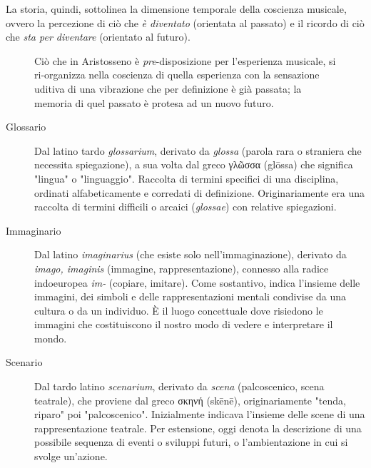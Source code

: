 \documentclass{gs}
\begin{document}
La storia, quindi, sottolinea la dimensione temporale della coscienza musicale, ovvero la percezione di ciò che \emph{è diventato} (orientata al passato) e il ricordo di ciò che \emph{sta per diventare} (orientato al futuro).

\begin{figure}[htbp]
\begin{center}
\caption{Ciò che in Aristosseno è \emph{pre}-disposizione per l'esperienza musicale, si ri-organizza nella coscienza  di quella esperienza con la sensazione uditiva di una vibrazione che per definizione è già passata; la memoria di quel passato è protesa ad un nuovo futuro.}
\label{coscienza}
\end{center}
\end{figure}

\begin{description}

  \item[Glossario] Dal latino tardo \emph{glossarium}, derivato da \emph{glossa} (parola rara o straniera che necessita spiegazione), a sua volta dal greco \textgreek{γλῶσσα} (glōssa) che significa "lingua" o "linguaggio".
Raccolta di termini specifici di una disciplina, ordinati alfabeticamente e corredati di definizione. Originariamente era una raccolta di termini difficili o arcaici (\emph{glossae}) con relative spiegazioni.

  \item[Immaginario] Dal latino \emph{imaginarius} (che esiste solo nell'immaginazione), derivato da \emph{imago, imaginis} (immagine, rappresentazione), connesso alla radice indoeuropea \emph{im-} (copiare, imitare).
Come sostantivo, indica l'insieme delle immagini, dei simboli e delle rappresentazioni mentali condivise da una cultura o da un individuo. È il luogo concettuale dove risiedono le immagini che costituiscono il nostro modo di vedere e interpretare il mondo.

  \item[Scenario] Dal tardo latino \emph{scenarium}, derivato da \emph{scena} (palcoscenico, scena teatrale), che proviene dal greco \textgreek{σκηνή} (skēnē), originariamente "tenda, riparo" poi "palcoscenico".
Inizialmente indicava l'insieme delle scene di una rappresentazione teatrale. Per estensione, oggi denota la descrizione di una possibile sequenza di eventi o sviluppi futuri, o l'ambientazione in cui si svolge un'azione.

\end{description}
\end{document}
